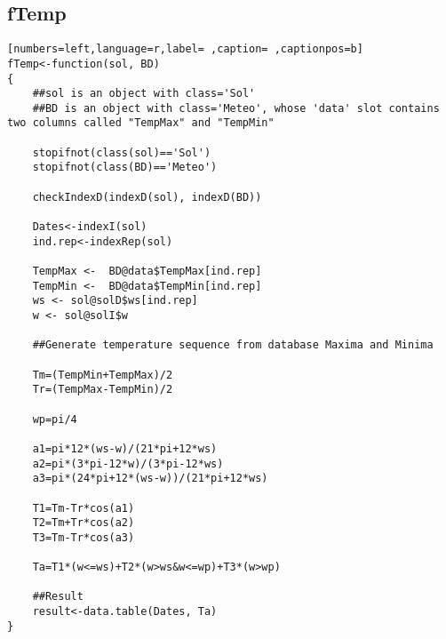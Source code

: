 \subsection{fTemp}
\label{sec:orgaf174c4}
\begin{lstlisting}[numbers=left,language=r,label= ,caption= ,captionpos=b]
fTemp<-function(sol, BD)
{
    ##sol is an object with class='Sol'
    ##BD is an object with class='Meteo', whose 'data' slot contains two columns called "TempMax" and "TempMin"

    stopifnot(class(sol)=='Sol')
    stopifnot(class(BD)=='Meteo')

    checkIndexD(indexD(sol), indexD(BD))

    Dates<-indexI(sol)	
    ind.rep<-indexRep(sol)

    TempMax <-  BD@data$TempMax[ind.rep]
    TempMin <-  BD@data$TempMin[ind.rep]
    ws <- sol@solD$ws[ind.rep]
    w <- sol@solI$w

    ##Generate temperature sequence from database Maxima and Minima

    Tm=(TempMin+TempMax)/2
    Tr=(TempMax-TempMin)/2

    wp=pi/4

    a1=pi*12*(ws-w)/(21*pi+12*ws)
    a2=pi*(3*pi-12*w)/(3*pi-12*ws)
    a3=pi*(24*pi+12*(ws-w))/(21*pi+12*ws)

    T1=Tm-Tr*cos(a1)
    T2=Tm+Tr*cos(a2)
    T3=Tm-Tr*cos(a3)

    Ta=T1*(w<=ws)+T2*(w>ws&w<=wp)+T3*(w>wp)

    ##Result
    result<-data.table(Dates, Ta)
}
\end{lstlisting}
